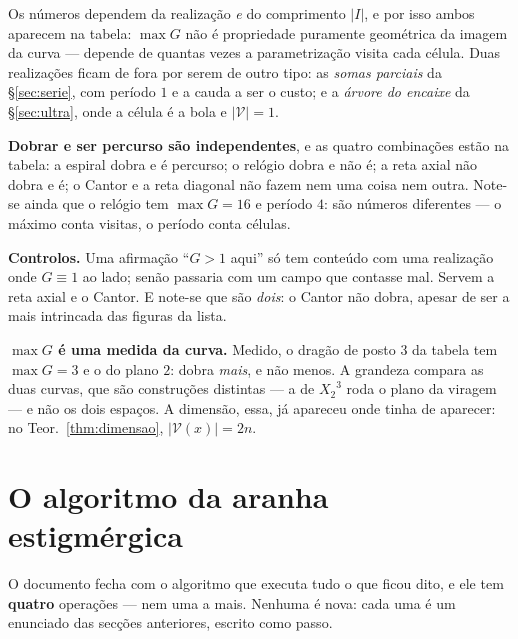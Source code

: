 \documentclass[11pt,a4paper]{article}
\newcommand{\abs}[1]{\lvert #1\rvert}
\newcommand{\Zc}{\ensuremath{X_2}}
\begin{document}
\medskip\noindent Os números dependem da realização \emph{e} do comprimento
$\abs{I}$, e por isso ambos aparecem na tabela: $\max G$ não é propriedade
puramente geométrica da imagem da curva --- depende de quantas vezes a
parametrização visita cada célula. Duas realizações ficam de
fora por serem de outro tipo: as \emph{somas parciais} da §\ref{sec:serie}, com
período $1$ e a cauda a ser o custo; e a \emph{árvore do encaixe} da
§\ref{sec:ultra}, onde a célula é a bola e $\lvert\mathcal{V}\rvert=1$.

\medskip\noindent\textbf{Dobrar e ser percurso são independentes}, e as quatro
combinações estão na tabela: a espiral dobra e é percurso; o relógio dobra e não
é; a reta axial não dobra e é; o Cantor e a reta diagonal não fazem nem uma
coisa nem outra. Note-se ainda que o relógio tem $\max G=16$ e período $4$: são
números diferentes --- o máximo conta visitas, o período conta células.

\medskip\noindent\textbf{Controlos.} Uma afirmação ``$G>1$ aqui'' só tem
conteúdo com uma realização onde $G\equiv1$ ao lado; senão passaria com um campo
que contasse mal. Servem a reta axial e o Cantor. E note-se que são \emph{dois}:
o Cantor não dobra, apesar de ser a mais intrincada das figuras da lista.

\medskip\noindent\textbf{$\max G$ é uma medida da curva.} Medido, o dragão de
posto $3$ da tabela tem $\max G=3$ e o do plano $2$: dobra \emph{mais}, e não menos.
A grandeza compara as duas curvas, que são construções distintas --- a de $\Zc^3$
roda o plano da viragem --- e não os dois espaços. A dimensão, essa, já apareceu
onde tinha de aparecer: no Teor.~\ref{thm:dimensao}, $\lvert \mathcal{V}(x)\rvert=2n$.

\section{O algoritmo da aranha estigmérgica}\label{sec:neuronio}

\noindent O documento fecha com o algoritmo que executa tudo o que ficou dito, e
ele tem \textbf{quatro} operações --- nem uma a mais. Nenhuma é nova: cada uma é
um enunciado das secções anteriores, escrito como passo.
\end{document}
